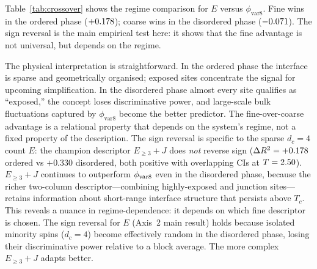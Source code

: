 \documentclass[aps,pre,preprint,superscriptaddress,showpacs]{revtex4-2}
\begin{document}
Table~\ref{tab:crossover} shows the regime comparison for $E$ versus
$\phi_{\mathrm{var8}}$.
Fine wins in the ordered phase ($+0.178$); coarse wins in the
disordered phase ($-0.071$).
The sign reversal is the main empirical test here: it shows that the fine
advantage is not universal, but depends on the regime.

The physical interpretation is straightforward.
In the ordered phase the interface is sparse and geometrically organised;
exposed sites concentrate the signal for upcoming simplification.
In the disordered phase almost every site qualifies as ``exposed,'' the
concept loses discriminative power, and large-scale bulk fluctuations
captured by $\phi_{\mathrm{var8}}$ become the better predictor.
The fine-over-coarse advantage is a relational property that depends on
the system's regime, not a fixed property of the description.
The sign reversal is specific to the sparse $d_c=4$ count $E$:
the champion descriptor $E_{\geq 3}+J$ does \emph{not} reverse sign
($\Delta R^2 = +0.178$ ordered vs $+0.330$ disordered, both
positive with overlapping CIs at $T=2.50$).
$E_{\geq 3}+J$ continues to outperform $\phi_{\rm var8}$ even in the
disordered phase, because the richer two-column descriptor---combining
highly-exposed and junction sites---retains information about short-range
interface structure that persists above $T_c$.
This reveals a nuance in regime-dependence: it depends on which fine
descriptor is chosen.
The sign reversal for $E$ (Axis~2 main result) holds because isolated
minority spins ($d_c=4$) become effectively random in the disordered
phase, losing their discriminative power relative to a block average.
The more complex $E_{\geq 3}+J$ adapts better.
\end{document}
